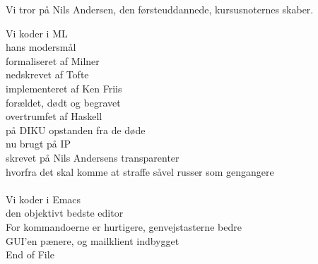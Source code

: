 \documentclass[a4paper,11pt]{article}
\begin{document}
\begin{sketch}

   Vi tror på Nils Andersen, den førsteuddannede,
  kursusnoternes skaber.

  Vi koder i ML\\
  hans modersmål\\
  formaliseret af Milner\\
  nedskrevet af Tofte\\
  implementeret af Ken Friis\\
  forældet, dødt og begravet\\
  overtrumfet af Haskell\\
  på DIKU opstanden fra de døde\\
  nu brugt på IP\\
  skrevet på Nils Andersens transparenter\\
  hvorfra det skal komme at straffe såvel russer som gengangere\\
\\
  Vi koder i Emacs\\
  den objektivt bedste editor\\
  For kommandoerne er hurtigere, genvejstasterne bedre\\
  GUI'en pænere, og mailklient indbygget\\
  End of File
\end{sketch}
\end{document}
